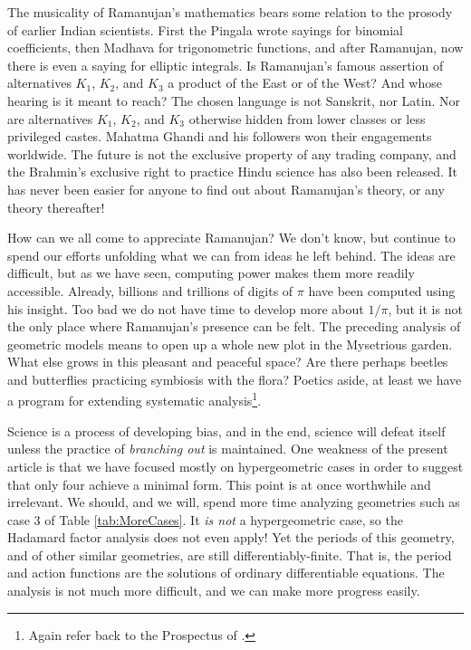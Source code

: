 \documentclass[nofootinbib,preprint]{revtex4-1}
\begin{document}
The musicality of Ramanujan's mathematics bears some relation to the prosody of earlier Indian
scientists. First the Pingala wrote sayings for binomial 
coefficients, then Madhava for trigonometric functions, and after Ramanujan, now there is even a saying 
for elliptic integrals. Is Ramanujan's famous assertion of alternatives $K_1$, $K_2$, and $K_3$ 
a product of the East or of the West? And whose hearing is it meant to reach? The chosen language
is not Sanskrit, nor Latin. Nor are alternatives $K_1$, $K_2$, and $K_3$ otherwise hidden from 
lower classes or less privileged castes. Mahatma Ghandi and his followers won their engagements worldwide. 
The future is not the exclusive property of any trading company, and the Brahmin's exclusive right 
to practice Hindu science has also been released. It has never been easier for anyone to find out about 
Ramanujan's theory, or any theory thereafter! 

How can we all come to appreciate Ramanujan? We don't know, but continue 
to spend our efforts unfolding what we can from ideas he left behind. The ideas are difficult,
but as we have seen, computing power makes them more readily accessible. Already,
billions and trillions of digits of $\pi$ have been computed using his insight. 
Too bad we do not have time to develop more about $1/\pi$, but it is not the only
place where Ramanujan's presence can be felt. The preceding analysis of geometric 
models means to open up a whole new plot in the Mysetrious garden. What else 
grows in this pleasant and peaceful space? Are there perhaps beetles and 
butterflies practicing symbiosis with the flora? Poetics aside, at least we have a program for 
extending systematic analysis\footnote{Again refer back to the Prospectus of \cite{KLEE2020Prelude}.}.  

Science is a process of developing bias, and in the end, science will defeat 
itself unless the practice of \textit{branching out} is maintained. One weakness
of the present article is that we have focused mostly on hypergeometric cases 
in order to suggest that only four achieve a minimal form. This point is at once 
worthwhile and irrelevant. We should, and we will, spend more time analyzing geometries 
such as case 3 of Table \ref{tab:MoreCases}. It \textit{is not} a hypergeometric
case, so the Hadamard factor analysis does not even apply! Yet the periods 
of this geometry, and of other similar geometries, are still differentiably-finite.
That is, the period and action functions are the solutions of ordinary differentiable
equations. The analysis is not much more difficult, and we can make more progress
easily.
\end{document}
